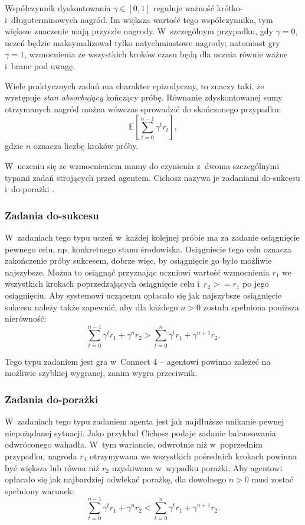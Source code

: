 \documentclass[a4paper, 12pt, oneside]{report}
\begin{document}
Współczynnik dyskontowania $\gamma \in {[0, 1]}$ reguluje ważność krótko- i~długoterminowych nagród. Im większa wartość tego współczynnika, tym większe znaczenie mają przyszłe nagrody. W~szczególnym przypadku, gdy $\gamma=0$, uczeń będzie maksymalizował tylko natychmiastowe nagrody; natomiast gry $\gamma=1$, wzmocnienia ze wszystkich kroków czasu będą dla ucznia równie ważne i~brane pod uwagę.

Wiele praktycznych zadań ma charakter epizodyczny, to znaczy taki, że występuje \emph{stan absorbujący} kończący próbę. Równanie zdyskontowanej sumy otrzymanych nagród można wówczas sprowadzić do skończonego przypadku:
\begin{equation}
\mathbb{E}\left[\sum_{t=0}^{n-1}\gamma^t r_t\right],
\end{equation}
gdzie $n$ oznacza liczbę kroków próby.

 W~uczeniu się ze wzmocnieniem mamy do czynienia z~dwoma szczególnymi typami zadań strojących przed agentem. Cichosz nazywa je zadaniami do-sukcesu i~do-porażki \cite{Cichosz00}.

\subsubsection{Zadania do-sukcesu}
 W~zadaniach tego typu uczeń w~każdej kolejnej próbie ma za zadanie osiągnięcie pewnego celu, np. konkretnego stanu środowiska. Osiągniecie tego celu oznacza zakończenie próby sukcesem, dobrze więc, by osiągnięcie go było możliwie najszybsze. Można to osiągnąć przyznając uczniowi wartość wzmocnienia $r_1$ we wszystkich krokach poprzedzających osiągnięcie celu i~$r_2 >= r_1$ po jego osiągnięciu. Aby systemowi uczącemu opłacało się jak najszybsze osiągnięcie sukcesu należy także zapewnić, aby dla każdego $n > 0$ została spełniona poniższa nierówność:
\begin{equation}
\sum_{t=0}^{n-1} \gamma^tr_1 + \gamma^nr_2 > \sum_{t=0}^n \gamma^tr_1 + \gamma^{n+1}r_2.
\end{equation}

Tego typu zadaniem jest gra w~Connect 4 -- agentowi powinno zależeć na możliwie szybkiej wygranej, zanim wygra przeciwnik.

\subsubsection{Zadania do-porażki}
 W~zadaniach tego typu zadaniem agenta jest jak najdłuższe unikanie pewnej niepożądanej sytuacji. Jako przykład Cichosz podaje zadanie balansowania odwróconego wahadła. W~tym wariancie, odwrotnie niż w~poprzednim przypadku, nagroda $r_1$ otrzymywana we wszystkich pośrednich krokach powinna być większa lub równa niż $r_2$ uzyskiwana w~wypadku porażki. Aby agentowi opłacało się jak najbardziej odwlekać porażkę, dla dowolnego $n > 0$ musi zostać spełniony warunek:
\begin{equation}
\sum_{t=0}^{n-1} \gamma^tr_1 + \gamma^nr_2 < \sum_{t=0}^n \gamma^tr_1 + \gamma^{n+1}r_2.
\end{equation}
\end{document}
